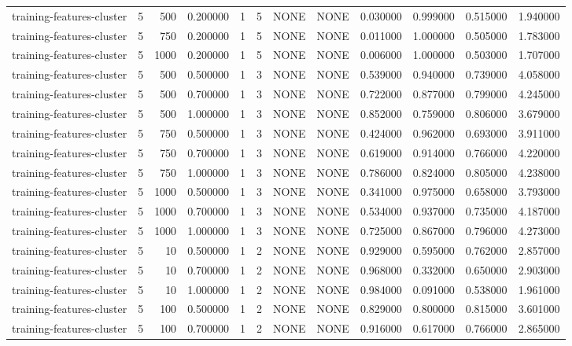 \begin{tabular}{lrrrllllrrrr}
training-features-cluster & 5 & 500 & 0.200000 & 1 & 5 & NONE & NONE & 0.030000 & 0.999000 & 0.515000 & 1.940000 \\
training-features-cluster & 5 & 750 & 0.200000 & 1 & 5 & NONE & NONE & 0.011000 & 1.000000 & 0.505000 & 1.783000 \\
training-features-cluster & 5 & 1000 & 0.200000 & 1 & 5 & NONE & NONE & 0.006000 & 1.000000 & 0.503000 & 1.707000 \\
training-features-cluster & 5 & 500 & 0.500000 & 1 & 3 & NONE & NONE & 0.539000 & 0.940000 & 0.739000 & 4.058000 \\
training-features-cluster & 5 & 500 & 0.700000 & 1 & 3 & NONE & NONE & 0.722000 & 0.877000 & 0.799000 & 4.245000 \\
training-features-cluster & 5 & 500 & 1.000000 & 1 & 3 & NONE & NONE & 0.852000 & 0.759000 & 0.806000 & 3.679000 \\
training-features-cluster & 5 & 750 & 0.500000 & 1 & 3 & NONE & NONE & 0.424000 & 0.962000 & 0.693000 & 3.911000 \\
training-features-cluster & 5 & 750 & 0.700000 & 1 & 3 & NONE & NONE & 0.619000 & 0.914000 & 0.766000 & 4.220000 \\
training-features-cluster & 5 & 750 & 1.000000 & 1 & 3 & NONE & NONE & 0.786000 & 0.824000 & 0.805000 & 4.238000 \\
training-features-cluster & 5 & 1000 & 0.500000 & 1 & 3 & NONE & NONE & 0.341000 & 0.975000 & 0.658000 & 3.793000 \\
training-features-cluster & 5 & 1000 & 0.700000 & 1 & 3 & NONE & NONE & 0.534000 & 0.937000 & 0.735000 & 4.187000 \\
training-features-cluster & 5 & 1000 & 1.000000 & 1 & 3 & NONE & NONE & 0.725000 & 0.867000 & 0.796000 & 4.273000 \\
training-features-cluster & 5 & 10 & 0.500000 & 1 & 2 & NONE & NONE & 0.929000 & 0.595000 & 0.762000 & 2.857000 \\
training-features-cluster & 5 & 10 & 0.700000 & 1 & 2 & NONE & NONE & 0.968000 & 0.332000 & 0.650000 & 2.903000 \\
training-features-cluster & 5 & 10 & 1.000000 & 1 & 2 & NONE & NONE & 0.984000 & 0.091000 & 0.538000 & 1.961000 \\
training-features-cluster & 5 & 100 & 0.500000 & 1 & 2 & NONE & NONE & 0.829000 & 0.800000 & 0.815000 & 3.601000 \\
training-features-cluster & 5 & 100 & 0.700000 & 1 & 2 & NONE & NONE & 0.916000 & 0.617000 & 0.766000 & 2.865000 \\

\end{tabular}
